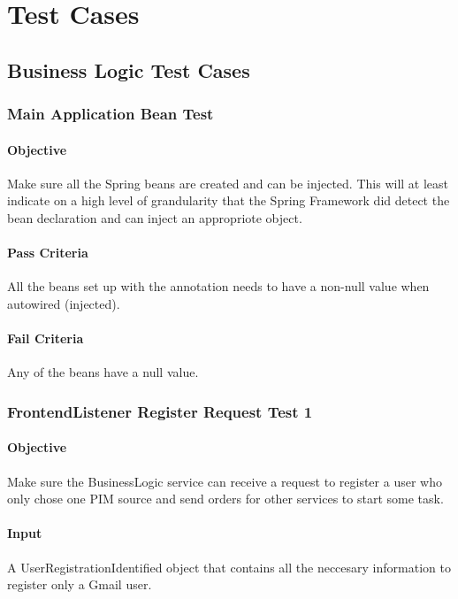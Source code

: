 \documentclass[hidelinks,english]{article}
\begin{document}
	\section{Test Cases}
		\subsection{Business Logic Test Cases}
			\subsubsection{Main Application Bean Test}\label{businessapplicationbeanstest}
				\paragraph{Objective} Make sure all the Spring beans are created and can be injected. This will at least indicate on a high level of grandularity that the Spring Framework did detect the bean declaration and can inject an appropriote object.
				\paragraph{Pass Criteria} All the beans set up with the \emph{\@Bean} annotation needs to have a non-null value when autowired (injected).
				\paragraph{Fail Criteria} Any of the beans have a null value.
		
			\subsubsection{FrontendListener Register Request Test 1}\label{businessfrontendlistenerregistertest1}
				\paragraph{Objective} Make sure the BusinessLogic service can receive a request to register a user who only chose one PIM source and send orders for other services to start some task.
				\paragraph{Input} A UserRegistrationIdentified object that contains all the neccesary information to register only a Gmail user.
\end{document}
